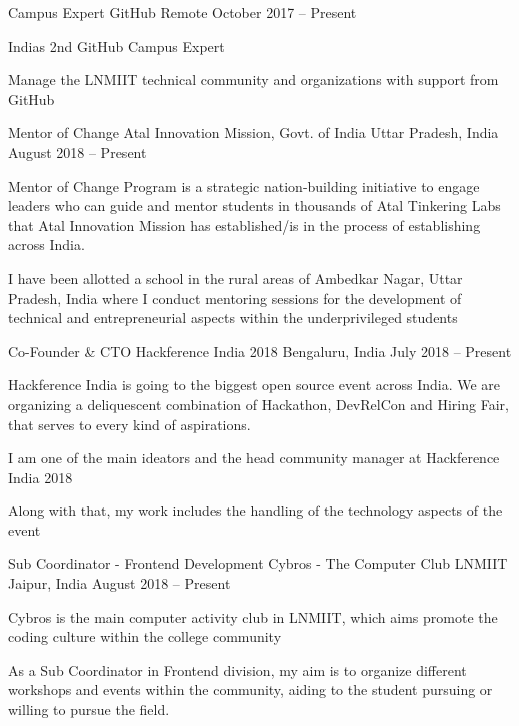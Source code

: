 \begin{cventries}
  \cventry
	{Campus Expert}
	{GitHub}
	{Remote}
	{October 2017 – Present}
	{\begin{cvitems}
		\item {India\textquotesingle{}s 2nd GitHub Campus Expert}
		\item {Manage the LNMIIT technical community and organizations with support from GitHub}
		\end{cvitems}}

  \cventry
	{Mentor of Change}
	{Atal Innovation Mission, Govt. of India}
	{Uttar Pradesh, India}
	{August 2018 – Present}
	{\begin{cvitems}
	\item {Mentor of Change Program is a strategic nation-building initiative to engage leaders who can guide and mentor students in thousands of Atal Tinkering Labs that Atal Innovation Mission has established/is in the process of establishing across India.}
	\item {I have been allotted a school in the rural areas of Ambedkar Nagar, Uttar Pradesh, India where I conduct mentoring sessions for the development of technical and entrepreneurial aspects within the underprivileged students}
		\end{cvitems}}
  \cventry
	{Co-Founder \& CTO}
	{Hackference India 2018}
	{Bengaluru, India}
	{July 2018 – Present}
	{\begin{cvitems}
		\item {Hackference India is going to the biggest open source event across India. We are organizing a deliquescent combination of Hackathon, DevRelCon and Hiring Fair, that serves to every kind of aspirations.}
		\item {I am one of the main ideators and the head community manager at Hackference India 2018}
		\item {Along with that, my work includes the handling of the technology aspects of the event}
		\end{cvitems}}
  \cventry
	{Sub Coordinator - Frontend Development}
	{Cybros - The Computer Club LNMIIT}
	{Jaipur, India}
	{August 2018 – Present}
	{\begin{cvitems}
		\item {Cybros is the main computer activity club in LNMIIT, which aims promote the coding culture within the college community}
		\item {As a Sub Coordinator in Frontend division, my aim is to organize different workshops and events within the community, aiding to the student pursuing or willing to pursue the field.}

\end{cvitems}}
\end{cventries}
